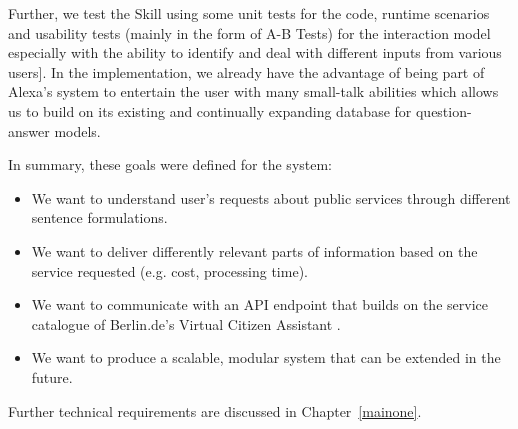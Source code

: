 Further, we test the Skill using some unit tests %
for the code, runtime scenarios and usability tests (mainly in the form of A-B Tests) for the interaction model especially with the ability to identify and deal with different inputs from various users].
In the implementation, we already have the advantage of being part of Alexa's system to entertain the user with
many small-talk abilities 
which allows us to build on its existing and continually expanding database for question-answer models.


In summary, these goals were defined for the system:

\begin{itemize}
	\item We want to understand user's requests about public services through different sentence formulations.
	
	\item We want to deliver differently relevant parts of information based on the service requested (e.g. cost, processing time).
	
	\item We want to communicate with an API endpoint that builds on the service catalogue of Berlin.de's %
		Virtual Citizen Assistant
.
	
	\item We want to produce a scalable, modular system that can be extended in the future.
\end{itemize}

Further technical requirements are discussed in Chapter~\ref{mainone}.






















